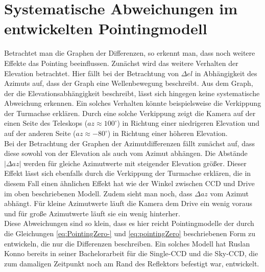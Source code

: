 \section{Systematische Abweichungen im entwickelten Pointingmodell}
Betrachtet man die Graphen der Differenzen, so erkennt man, dass noch weitere Effekte das Pointing beeinflussen. Zunächst wird das weitere Verhalten der Elevation betrachtet. Hier fällt bei der Betrachtung von $\Delta el$ in Abhängigkeit des Azimuts auf, dass der Graph eine Wellenbewegung beschreibt. Aus dem Graph, der die Elevationsabhängigkeit beschreibt, lässt sich hingegen keine systematische Abweichung erkennen. Ein solches Verhalten könnte beispielsweise die Verkippung der Turmachse erklären. Durch eine solche Verkippung zeigt die Kamera auf der einen Seite des Teleskops ($az\approx100^{\circ}$) in Richtung einer niedrigeren Elevation und auf der anderen Seite ($az\approx-80^{\circ}$) in Richtung einer höheren Elevation.\\
Bei der Betrachtung der Graphen der Azimutdifferenzen fällt zunächst auf, dass diese sowohl von der Elevation als auch vom Azimut abhängen. Die Abstände $\left| \Delta az \right|$ werden für gleiche Azimutwerte mit steigender Elevation größer. Dieser Effekt lässt sich ebenfalls durch die Verkippung der Turmachse erklären, die in diesem Fall einen ähnlichen Effekt hat wie der Winkel zwischen CCD und Drive im oben beschriebenen Modell. Zudem sieht man noch, dass $\Delta az$ vom Azimut abhängt. Für kleine Azimutwerte läuft die Kamera dem Drive ein wenig voraus und für große Azimutwerte läuft sie ein wenig hinterher.\\
Diese Abweichungen sind so klein, dass es hier reicht Pointingmodelle der durch die Gleichungen \ref{eq:PointingZero-} und \ref{eq:pointingZero} beschriebenen Form zu entwickeln, die nur die Differenzen beschreiben. Ein solches Modell hat Ruslan Konno bereits in seiner Bachelorarbeit \cite{Ruslan} für die Single-CCD und die Sky-CCD, die zum damaligen Zeitpunkt noch am Rand des Reflektors befestigt war, entwickelt. 
